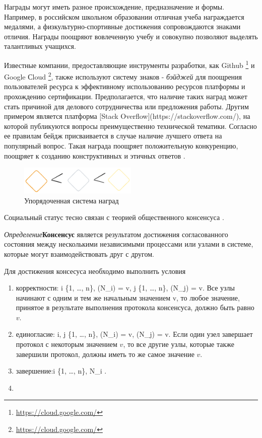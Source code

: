 Награды могут иметь разное происхождение, предназначение и формы. 
Например, в российском школьном образовании отличная учеба награждается медалями, а физкультурно-спортивные достижения сопровождаются знаками отличия.
Награды поощряют вовлеченную учебу и совокупно позволяют выделять талантливых учащихся. 

Известные компании, предоставляющие инструменты разработки, как Github \footnote{\url{https://cloud.google.com/}}
и Google Сloud \footnote{\url{https://cloud.google.com/}}, также используют систему знаков - \textit{бэйджей} 
для поощрения пользователей ресурса к эффективному использованию ресурсов платформы и прохождению сертификации. 
Предполагается, что наличие таких наград может стать причиной для делового сотрудничества или предложения работы. Другим примером является платформа [Stack Overflow](https://stackoverflow.com/),
на которой публикуются вопросы преимущественно технической тематики.
Согласно ее правилам бейдж присваивается в случае наличие лучшего ответа на популярный вопрос.
Такая награда поощряет положительную конкуренцию, поощряет к созданию конструктивных и этичных ответов \cite{yanovsky2021one}.
\begin{figure}[h]
    \centering
    \includegraphics[width=0.5\textwidth]{assets/pedagogic/social/badge.excalidraw.png}
    \caption{Упорядоченная система наград}
    \label{badge}
\end{figure}

Социальный статус тесно связан с теорией общественного консенсуса \cite{anderson2015desire}\cite{ridgeway2006consensus}. 

\textit{Определение}\textbf{Консенсус} является результатом достижения согласованного состояния между несколькими независимыми 
процессами или узлами в системе, которые могут взаимодействовать друг с другом. 

Для достижения консесуса необходимо выполнить условия \begin{enumerate}
    \item корректности: \forall i \in \{1, \ldots, n\},  (N_i) = v,  \forall j \in \{1, \ldots, n\}, (N_j) = v. Все узлы начинают с одним и тем же начальным значением v, то любое значение, принятое в результате выполнения протокола консенсуса, должно быть равно \( v \).
    \item единогласие: \forall i, j \in \{1, \ldots, n\},  (N_i) = v,  (N_j) = v. Если один узел завершает протокол с некоторым значением \( v \), то все другие узлы, которые также завершили протокол, должны иметь то же самое значение \( v \).
    \item завершение:\forall i \in \{1, \ldots, n\},  N_i .
    \item 
\end{enumerate}


